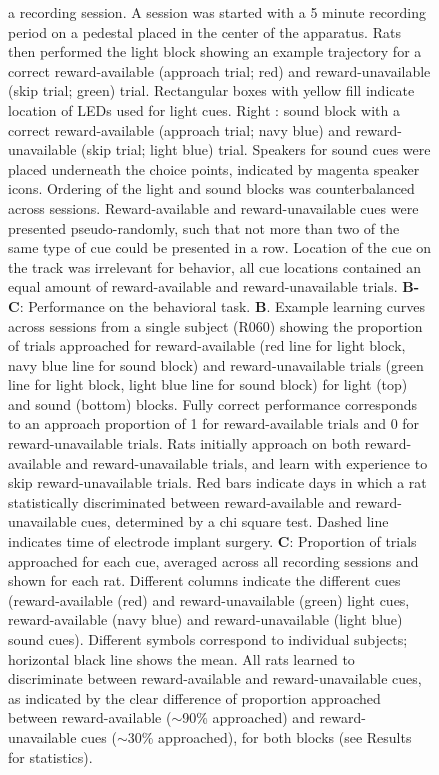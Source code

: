 \documentclass[11pt]{article}
\newcommand{\bsf}[1]{\textbf{#1}}
\providecommand{\DIFadd}[1]{{\protect\color{red} \sf #1}} %
\providecommand{\DIFdel}[1]{} %
\providecommand{\DIFaddFL}[1]{\DIFadd{#1}} %
\providecommand{\DIFdelFL}[1]{\DIFdel{#1}} %
\providecommand{\DIFaddbeginFL}{} %
\providecommand{\DIFaddendFL}{} %
\providecommand{\DIFdelbeginFL}{} %
\providecommand{\DIFdelendFL}{} %
\newcommand{\DIFscaledelfig}{0.5}
\newlength{\DIFdelgraphicswidth} %
\newlength{\DIFdelgraphicsheight} %
\newcommand{\DIFaddincludegraphics}[2][]{{\color{red}\fbox{\DIFOincludegraphics[#1]{#2}}}} %
\newcommand{\DIFdelincludegraphics}[2][]{%
\sbox{\DIFdelgraphicsbox}{\DIFOincludegraphics[#1]{#2}}%
\settoboxwidth{\DIFdelgraphicswidth}{\DIFdelgraphicsbox} %
\settoboxtotalheight{\DIFdelgraphicsheight}{\DIFdelgraphicsbox} %
\scalebox{\DIFscaledelfig}{%
\parbox[b]{\DIFdelgraphicswidth}{\usebox{\DIFdelgraphicsbox}\\[-\baselineskip] \rule{\DIFdelgraphicswidth}{0em}}\llap{\resizebox{\DIFdelgraphicswidth}{\DIFdelgraphicsheight}{%
\setlength{\unitlength}{\DIFdelgraphicswidth}%
\begin{picture}(1,1)%
\thicklines\linethickness{2pt} %
{\color[rgb]{1,0,0}\put(0,0){\framebox(1,1){}}}%
{\color[rgb]{1,0,0}\put(0,0){\line( 1,1){1}}}%
{\color[rgb]{1,0,0}\put(0,1){\line(1,-1){1}}}%
\end{picture}%
}\hspace*{3pt}}} %
} %
\DeclareRobustCommand{\DIFaddbeginFL}{\DIFOaddbeginFL \let\includegraphics\DIFaddincludegraphics} %
\DeclareRobustCommand{\DIFaddendFL}{\DIFOaddendFL \let\includegraphics\DIFOincludegraphics} %
\DeclareRobustCommand{\DIFdelbeginFL}{\DIFOdelbeginFL \let\includegraphics\DIFdelincludegraphics} %
\DeclareRobustCommand{\DIFdelendFL}{\DIFOaddendFL \let\includegraphics\DIFOincludegraphics} %
\begin{document}
\begin{figure}[ht!]
{{a recording session. A session was started with a 5 minute recording period on
a pedestal placed in the center of the apparatus. Rats then performed the }\DIFdelendFL light \DIFdelbeginFL \DIFdelFL{and sound blocks of the cue discrimination task in succession for 100 trials each, followed by another 5 minute recording period on the pedestal. Left in figure depicts a light }\DIFdelendFL block \DIFdelbeginFL \DIFdelFL{, }\DIFdelendFL showing an example trajectory for a correct reward-available (approach trial; red) and reward-unavailable (skip trial; green) trial. \DIFaddbeginFL \DIFaddFL{Rectangular boxes with yellow fill indicate location of LEDs used for light cues. }\DIFaddendFL Right\DIFdelbeginFL \DIFdelFL{in figure depicts a }\DIFdelendFL \DIFaddbeginFL \DIFaddFL{: }\DIFaddendFL sound block \DIFdelbeginFL \DIFdelFL{, }\DIFdelendFL with a \DIFaddbeginFL \DIFaddFL{correct }\DIFaddendFL reward-available (approach trial; navy blue) and reward-unavailable (skip trial; light blue) trial. \DIFaddbeginFL \DIFaddFL{Speakers for sound cues were placed underneath the choice points, indicated by magenta speaker icons. }\DIFaddendFL Ordering of the light and sound blocks was counterbalanced across sessions. Reward-available and reward-unavailable cues were presented pseudo-randomly, such that not more than two of the same type of cue could be presented in a row. Location of the cue on the track was irrelevant for behavior, all cue locations contained an equal amount of reward-available and reward-unavailable trials. \DIFaddbeginFL \DIFaddFL{\bsf{B-C}: Performance on the behavioral task. \bsf{B}. Example learning curves across sessions from a single subject (R060) showing the proportion of trials approached for reward-available (red line for light block, navy blue line for sound block) and reward-unavailable trials (green line for light block, light blue line for sound block) for light (top) and sound (bottom) blocks. Fully correct performance corresponds to an approach proportion of 1 for reward-available trials and 0 for reward-unavailable trials. Rats initially approach on both reward-available and reward-unavailable trials, and learn with experience to skip reward-unavailable trials. Red bars indicate days in which a rat statistically discriminated between reward-available and reward-unavailable cues, determined by a chi square test. Dashed line indicates time of electrode implant surgery. \bsf{C}: Proportion of trials approached for each cue, averaged across all recording sessions and shown for each rat. Different columns indicate the different cues (reward-available (red) and reward-unavailable (green) light cues, reward-available (navy blue) and reward-unavailable (light blue) sound cues). Different symbols correspond to individual subjects; horizontal black line shows the mean. All rats learned to discriminate between reward-available and reward-unavailable cues, as indicated by the clear difference of proportion approached between reward-available ($\sim$90\% approached) and reward-unavailable cues ($\sim$30\% approached), for both blocks (see Results for statistics).}\DIFaddendFL }
\DIFdelbeginFL %


\end{figure}
\end{document}
